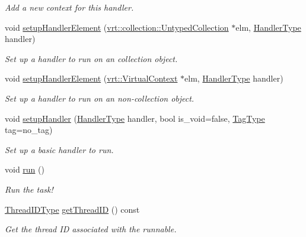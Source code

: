 \begin{DoxyCompactItemize}
\begin{DoxyCompactList}\small\item\em Add a new context for this handler. \end{DoxyCompactList}\item 
void \hyperlink{structvt_1_1runnable_1_1_runnable_new_aa494c41e589866c5a7f1669a5c2472b0}{setup\+Handler\+Element} (\hyperlink{structvt_1_1vrt_1_1collection_1_1_untyped_collection}{vrt\+::collection\+::\+Untyped\+Collection} $\ast$elm, \hyperlink{namespacevt_af64846b57dfcaf104da3ef6967917573}{Handler\+Type} handler)
\begin{DoxyCompactList}\small\item\em Set up a handler to run on an collection object. \end{DoxyCompactList}\item 
void \hyperlink{structvt_1_1runnable_1_1_runnable_new_aeaec7cf81fe97f2d6b57f35dbd408b5e}{setup\+Handler\+Element} (\hyperlink{structvt_1_1vrt_1_1_virtual_context}{vrt\+::\+Virtual\+Context} $\ast$elm, \hyperlink{namespacevt_af64846b57dfcaf104da3ef6967917573}{Handler\+Type} handler)
\begin{DoxyCompactList}\small\item\em Set up a handler to run on an non-\/collection object. \end{DoxyCompactList}\item 
void \hyperlink{structvt_1_1runnable_1_1_runnable_new_ae6052ee648ca061be2b3b2786ab7b013}{setup\+Handler} (\hyperlink{namespacevt_af64846b57dfcaf104da3ef6967917573}{Handler\+Type} handler, bool is\+\_\+void=false, \hyperlink{namespacevt_a84ab281dae04a52a4b243d6bf62d0e52}{Tag\+Type} tag=no\+\_\+tag)
\begin{DoxyCompactList}\small\item\em Set up a basic handler to run. \end{DoxyCompactList}\item 
void \hyperlink{structvt_1_1runnable_1_1_runnable_new_a3fa6c8ee2214c074c748000f782ad793}{run} ()
\begin{DoxyCompactList}\small\item\em Run the task! \end{DoxyCompactList}\item 
\hyperlink{namespacevt_a9b887d814dd25ff495a0c8270304ac02}{Thread\+I\+D\+Type} \hyperlink{structvt_1_1runnable_1_1_runnable_new_a42ab8351e2003e8810711ef020a72931}{get\+Thread\+ID} () const
\begin{DoxyCompactList}\small\item\em Get the thread ID associated with the runnable. \end{DoxyCompactList}\item 

\end{DoxyCompactItemize}
